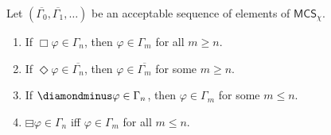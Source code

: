 \documentclass[envcountsect,envcountsame,oribibl,orivec]{llncs}
\newcommand{\lalways}{\Box}
\newcommand{\leventually}{\Diamond}
\newcommand{\lonce}{\diamondminus}
\newcommand{\lsofar}{\boxminus}
\renewcommand{\phi}{\varphi}
\newcommand{\MCS}{\mathsf{MCS}}
\begin{document}
\begin{lemma}\label{lem: MCS temporal properties}
Let $(\overline{\Gamma_0}, \overline{\Gamma_1}, \ldots)$ be an acceptable sequence of elements of $\MCS_\chi$. 

\begin{enumerate}
	\item If $\lalways \phi \in \Gamma_n$, then $\phi \in \Gamma_m$ for all $m \geq n$.
	
	\item If $\leventually \phi \in \overline{\Gamma_n}$, then $\phi \in \overline{\Gamma_{m}}$ for some $m \geq n$.
	
	\item If $\lonce \phi \in \Gamma_n$, then $\phi \in \Gamma_{m}$ for some $m \leq n$.
	

	\item  $\lsofar \phi \in \Gamma_n$ iff $\phi \in \Gamma_m$ for all $m \leq n$.
\end{enumerate}
\end{lemma}
\end{document}
